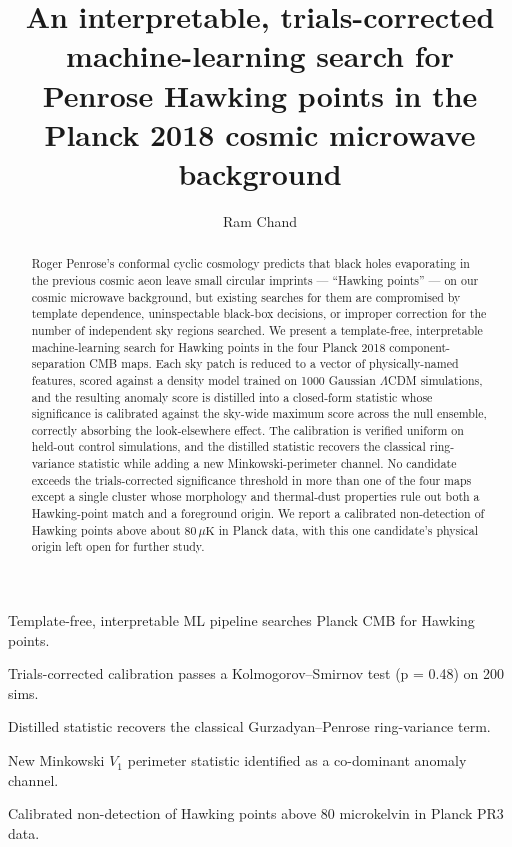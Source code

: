 \documentclass[preprint,12pt,nonatbib]{elsarticle}
\begin{document}
\begin{frontmatter}

\title{An interpretable, trials-corrected machine-learning search for Penrose Hawking points in the Planck 2018 cosmic microwave background}

\author{Ram Chand}

\begin{abstract}
Roger Penrose's conformal cyclic cosmology predicts that black holes evaporating in the previous cosmic aeon leave small circular imprints --- ``Hawking points'' --- on our cosmic microwave background, but existing searches for them are compromised by template dependence, uninspectable black-box decisions, or improper correction for the number of independent sky regions searched. We present a template-free, interpretable machine-learning search for Hawking points in the four Planck 2018 component-separation CMB maps. Each sky patch is reduced to a vector of physically-named features, scored against a density model trained on 1000 Gaussian $\Lambda$CDM simulations, and the resulting anomaly score is distilled into a closed-form statistic whose significance is calibrated against the sky-wide maximum score across the null ensemble, correctly absorbing the look-elsewhere effect. The calibration is verified uniform on held-out control simulations, and the distilled statistic recovers the classical ring-variance statistic while adding a new Minkowski-perimeter channel. No candidate exceeds the trials-corrected significance threshold in more than one of the four maps except a single cluster whose morphology and thermal-dust properties rule out both a Hawking-point match and a foreground origin. We report a calibrated non-detection of Hawking points above about $80\,\mu\mathrm{K}$ in Planck data, with this one candidate's physical origin left open for further study.
\end{abstract}

\begin{highlights}
\item Template-free, interpretable ML pipeline searches Planck CMB for Hawking points.
\item Trials-corrected calibration passes a Kolmogorov--Smirnov test (p = 0.48) on 200 sims.
\item Distilled statistic recovers the classical Gurzadyan--Penrose ring-variance term.
\item New Minkowski $V_1$ perimeter statistic identified as a co-dominant anomaly channel.
\item Calibrated non-detection of Hawking points above 80 microkelvin in Planck PR3 data.
\end{highlights}


\end{frontmatter}
\end{document}
